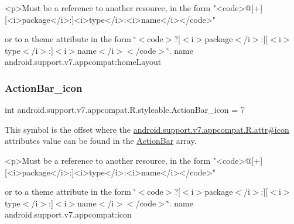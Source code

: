 \begin{DoxyVerb}      <p>Must be a reference to another resource, in the form "<code>@[+][<i>package</i>:]<i>type</i>:<i>name</i></code>"
\end{DoxyVerb}
 or to a theme attribute in the form \char`\"{}$<$code$>$?\mbox{[}$<$i$>$package$<$/i$>$\+:\mbox{]}\mbox{[}$<$i$>$type$<$/i$>$\+:\mbox{]}$<$i$>$name$<$/i$>$$<$/code$>$\char`\"{}.  name android.\+support.\+v7.\+appcompat\+:home\+Layout \mbox{\label{classandroid_1_1support_1_1v7_1_1appcompat_1_1R_1_1styleable_acfb20700021f93a2cdd2586aeb379c82}} 
\subsubsection{\texorpdfstring{Action\+Bar\+\_\+icon}{ActionBar\_icon}}
{\footnotesize\ttfamily int android.\+support.\+v7.\+appcompat.\+R.\+styleable.\+Action\+Bar\+\_\+icon = 7\hspace{0.3cm}{\ttfamily [static]}}

This symbol is the offset where the \hyperlink{classandroid_1_1support_1_1v7_1_1appcompat_1_1R_1_1attr_a1495dfa420da91a99a7d7c104558f64b}{android.\+support.\+v7.\+appcompat.\+R.\+attr\#icon} attribute\textquotesingle{}s value can be found in the \hyperlink{classandroid_1_1support_1_1v7_1_1appcompat_1_1R_1_1styleable_a5941dc15714398e9ec9afaa0155cc1cf}{Action\+Bar} array.

\begin{DoxyVerb}      <p>Must be a reference to another resource, in the form "<code>@[+][<i>package</i>:]<i>type</i>:<i>name</i></code>"
\end{DoxyVerb}
 or to a theme attribute in the form \char`\"{}$<$code$>$?\mbox{[}$<$i$>$package$<$/i$>$\+:\mbox{]}\mbox{[}$<$i$>$type$<$/i$>$\+:\mbox{]}$<$i$>$name$<$/i$>$$<$/code$>$\char`\"{}.  name android.\+support.\+v7.\+appcompat\+:icon \mbox{\label{classandroid_1_1support_1_1v7_1_1appcompat_1_1R_1_1styleable_a75ab0a5b4767d10e8ce49dbe359dea72}} 
